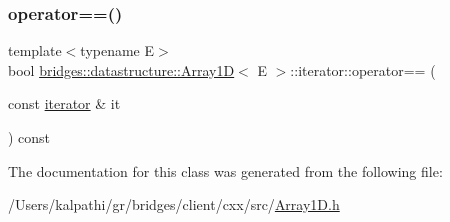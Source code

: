 \subsubsection{\texorpdfstring{operator==()}{operator==()}}
{\footnotesize\ttfamily template$<$typename E$>$ \\
bool \mbox{\hyperlink{classbridges_1_1datastructure_1_1_array1_d}{bridges\+::datastructure\+::\+Array1D}}$<$ E $>$\+::iterator\+::operator== (\begin{DoxyParamCaption}\item[{const \mbox{\hyperlink{classbridges_1_1datastructure_1_1_array1_d_1_1iterator}{iterator}} \&}]{it }\end{DoxyParamCaption}) const\hspace{0.3cm}{\ttfamily [inline]}}



The documentation for this class was generated from the following file\+:\begin{DoxyCompactItemize}
\item 
/\+Users/kalpathi/gr/bridges/client/cxx/src/\mbox{\hyperlink{_array1_d_8h}{Array1\+D.\+h}}\end{DoxyCompactItemize}
